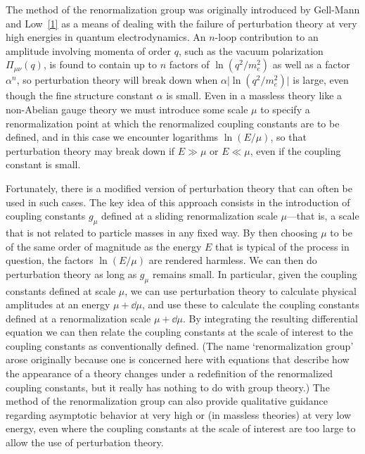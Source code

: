 
The method of the renormalization group was originally introduced by
Gell-Mann and Low~\hyperref[ch18-ref-1]{[1]} as a means of dealing with the
failure of perturbation theory at very high energies in quantum
electrodynamics. An $n$-loop contribution to an amplitude involving momenta
of order $q$, such as the vacuum polarization $\Pi_{\mu\nu}(q)$, is found to
contain up to $n$ factors of $\ln(q^2/m_e^2)$ as well as a factor $\alpha^n$,
so perturbation theory will break down when
$\alpha\lvert\ln(q^2/m_e^2)\rvert$ is large, even though the fine structure
constant $\alpha$ is small. Even in a massless theory like a non-Abelian
gauge theory we must introduce some scale $\mu$ to specify a renormalization
point at which the renormalized coupling constants are to be defined, and in
this case we encounter logarithms $\ln(E/\mu)$, so that perturbation theory
may break down if $E\gg\mu$ or $E\ll\mu$, even if the coupling constant is
small.

Fortunately, there is a modified version of perturbation theory that can
often be used in such cases. The key idea of this approach consists in the
introduction of coupling constants $g_\mu$ defined at a sliding
renormalization scale $\mu$---that is, a scale that is not related to particle
masses in any fixed way. By then choosing $\mu$ to be of the same order of
magnitude as the energy $E$ that is typical of the process in question, the
factors $\ln(E/\mu)$ are rendered harmless. We can then do perturbation theory
as long as $g_\mu$ remains small. In particular, given the coupling constants
defined at scale $\mu$, we can use perturbation theory to calculate physical
amplitudes at an energy $\mu+\dd\mu$, and use these to calculate the coupling
constants defined at a renormalization scale $\mu+\dd\mu$. By integrating the
resulting differential equation we can then relate the coupling constants at
the scale of interest to the coupling constants as conventionally defined.
(The name `renormalization group' arose originally because one is concerned
here with equations that describe how the appearance of a theory changes
under a redefinition of the renormalized coupling constants, but it really
has nothing to do with group theory.) The method of the renormalization group
can also provide qualitative guidance regarding asymptotic behavior at very
high or (in massless theories) at very low energy, even where the coupling
constants at the scale of interest are too large to allow the use of
perturbation theory.

